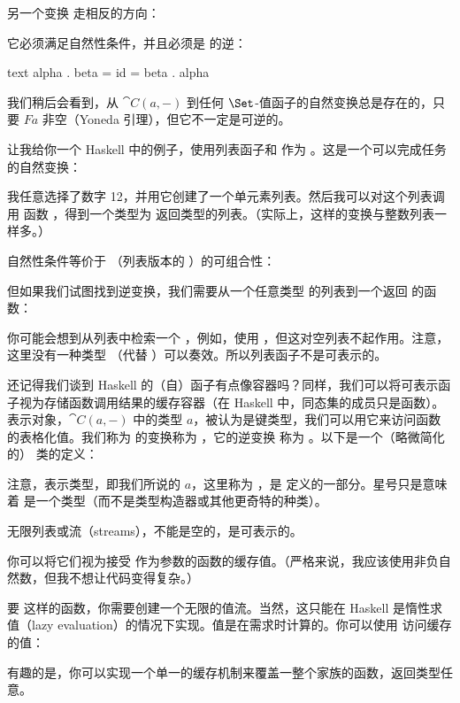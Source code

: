 另一个变换  走相反的方向：

它必须满足自然性条件，并且必须是  的逆：

\begin{snip}{text}
  alpha . beta = id = beta . alpha
\end{snip}
我们稍后会看到，从 $\cat{C}(a, -)$ 到任何 $\Set$-值函子的自然变换总是存在的，只要 $F a$ 非空（Yoneda 引理），但它不一定是可逆的。

让我给你一个 Haskell 中的例子，使用列表函子和  作为 。这是一个可以完成任务的自然变换：

我任意选择了数字 12，并用它创建了一个单元素列表。然后我可以对这个列表调用  函数 ，得到一个类型为  返回类型的列表。（实际上，这样的变换与整数列表一样多。）

自然性条件等价于 （列表版本的 ）的可组合性：

但如果我们试图找到逆变换，我们需要从一个任意类型  的列表到一个返回  的函数：

你可能会想到从列表中检索一个 ，例如，使用 ，但这对空列表不起作用。注意，这里没有一种类型 （代替 ）可以奏效。所以列表函子不是可表示的。

还记得我们谈到 Haskell 的（自）函子有点像容器吗？同样，我们可以将可表示函子视为存储函数调用结果的缓存容器（在 Haskell 中，同态集的成员只是函数）。表示对象，$\cat{C}(a, -)$ 中的类型 $a$，被认为是键类型，我们可以用它来访问函数的表格化值。我们称为  的变换称为 ，它的逆变换  称为 。以下是一个（略微简化的） 类的定义：

注意，表示类型，即我们所说的 $a$，这里称为 ，是  定义的一部分。星号只是意味着  是一个类型（而不是类型构造器或其他更奇特的种类）。

无限列表或流（streams），不能是空的，是可表示的。

你可以将它们视为接受  作为参数的函数的缓存值。（严格来说，我应该使用非负自然数，但我不想让代码变得复杂。）

要  这样的函数，你需要创建一个无限的值流。当然，这只能在 Haskell 是惰性求值（lazy evaluation）的情况下实现。值是在需求时计算的。你可以使用  访问缓存的值：

有趣的是，你可以实现一个单一的缓存机制来覆盖一整个家族的函数，返回类型任意。

